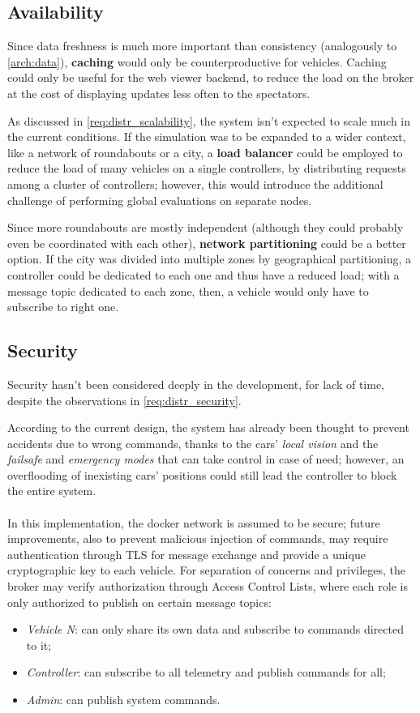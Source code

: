 \subsection{Availability}\label{arch:availability}
Since data freshness is much more important than consistency (analogously to
\ref{arch:data}), \textbf{caching} would only be counterproductive for vehicles.
Caching could only be useful for the web viewer backend, to reduce the load on
the broker at the cost of displaying updates less often to the spectators.

As discussed in \ref{req:distr_scalability}, the system isn't expected to scale
much in the current conditions. If the simulation was to be expanded to
a wider context, like a network of roundabouts or a city, a \textbf{load
balancer} could be employed to reduce the load of many vehicles on a single
controllers, by distributing requests among a cluster of controllers; however,
this would introduce the additional challenge of performing global evaluations
on separate nodes.

Since more roundabouts are mostly independent (although they could probably even
be coordinated with each other), \textbf{network partitioning} could be a better
option. If the city was divided into multiple zones by geographical
partitioning, a controller could be dedicated to each one and thus have a
reduced load; with a message topic dedicated to each zone, then, a vehicle would
only have to subscribe to right one.

\subsection{Security}\label{arch:security}
Security hasn't been considered deeply in the development, for lack of time,
despite the observations in \ref{req:distr_security}.

According to the current design, the system has already been thought to prevent
accidents due to wrong commands, thanks to the cars' \textit{local vision} and
the \textit{failsafe} and \textit{emergency modes} that can take control in case
of need; however, an overflooding of inexisting cars' positions could still lead
the controller to block the entire system.
\\
\\
In this implementation, the docker network is assumed to be secure; future
improvements, also to prevent malicious injection of commands, may require
authentication through TLS for message exchange and provide a unique
cryptographic key to each vehicle. For separation of concerns and privileges,
the broker may verify authorization through Access Control Lists, where each
role is only authorized to publish on certain message topics:
\begin{itemize}
  \item \textit{Vehicle N}: can only share its own data and subscribe to
  commands directed to it;
  \item \textit{Controller}: can subscribe to all telemetry and publish commands
  for all;
  \item \textit{Admin}: can publish system commands.
\end{itemize}
